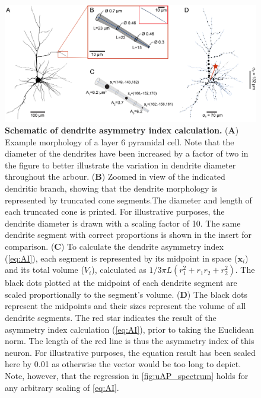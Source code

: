 \begin{figure}[h!]
    \centering
    \includegraphics[width=17cm]{Figures/chapter3/figureS7.png}
    \caption{\textbf{Schematic of dendrite asymmetry index calculation.} (\textbf{A}) Example morphology of a layer 6 pyramidal cell. Note that the diameter of the dendrites have been increased by a factor of two in the figure to better illustrate the variation in dendrite diameter throughout the arbour. (\textbf{B}) Zoomed in view of the indicated dendritic branch, showing that the dendrite morphology is represented by truncated cone segments.The diameter and length of each truncated cone is printed. For illustrative purposes, the dendrite diameter is drawn with a scaling factor of 10. The same dendrite segment with correct proportions is shown in the insert for comparison.  (\textbf{C}) To calculate the dendrite asymmetry index ({\ref{eq:AI}}), each segment is represented by its midpoint in space ($\bm{x}_i$) and its total volume ($V_i$), calculated as $1/3 \pi L (r_1^2 + r_1r_2 + r_2^2)$. The black dots plotted at the midpoint of each dendrite segment are scaled proportionally to the segment's volume. (\textbf{D}) The black dots represent the midpoints and their sizes represent the volume of all dendrite segments. The red star indicates the result of the asymmetry index calculation ({\ref{eq:AI}}), prior to taking the Euclidean norm. The length of the red line is thus the asymmetry index of this neuron. For illustrative purposes, the equation result has been scaled here by 0.01 as otherwise the vector would be too long to depict. Note, however, that the regression in {\autoref{fig:uAP_spectrum}} holds for any arbitrary scaling of {\ref{eq:AI}.}} 
    \label{fig:AI_fig}
\end{figure}

\clearpage

